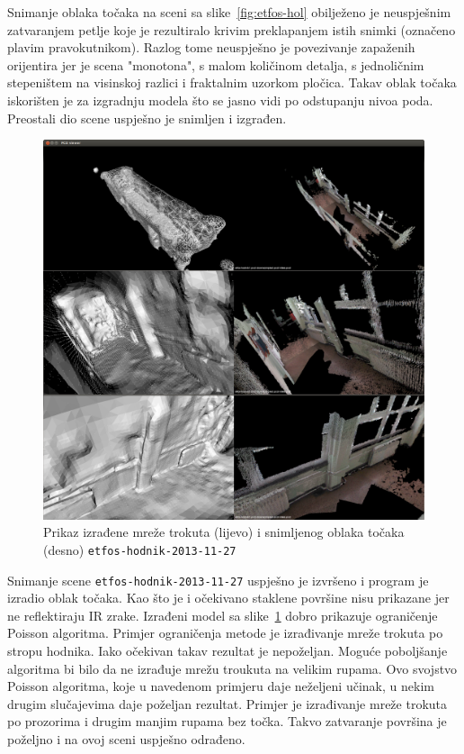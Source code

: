 Snimanje oblaka točaka na sceni sa slike~\ref{fig:etfos-hol} obilježeno
je neuspješnim zatvaranjem petlje koje je rezultiralo krivim
preklapanjem istih snimki (označeno plavim pravokutnikom). Razlog tome
neuspješno je povezivanje zapaženih orijentira jer je scena "monotona",
s malom količinom detalja, s jednoličnim stepeništem na visinskoj
razlici i fraktalnim uzorkom pločica. Takav oblak točaka iskorišten je
za izgradnju modela što se jasno vidi po odstupanju nivoa poda.
Preostali dio scene uspješno je snimljen i izgrađen.

\newpage
\begin{figure}[h]
\centering
\includegraphics[scale=0.25]{figures/04-etfos-hodnik1-vtk-pcd-all.png}
\caption{Prikaz izrađene mreže trokuta (lijevo) i snimljenog oblaka točaka
(desno) \texttt{etfos-hodnik-2013-11-27}} 
\label{fig:etfos-hodnik}
\end{figure}

Snimanje scene \texttt{etfos-hodnik-2013-11-27} uspješno je izvršeno i
program je izradio oblak točaka. Kao što je i očekivano staklene
površine nisu prikazane jer ne reflektiraju IR zrake. Izrađeni model sa
slike~\ref{fig:etfos-hodnik} dobro prikazuje ograničenje Poisson
algoritma. Primjer ograničenja metode je izrađivanje mreže trokuta po
stropu hodnika. Iako očekivan takav rezultat je nepoželjan. Moguće
poboljšanje algoritma bi bilo da ne izrađuje mrežu troukuta na velikim
rupama. Ovo svojstvo Poisson algoritma, koje u navedenom primjeru daje
neželjeni učinak, u nekim drugim slučajevima daje poželjan rezultat.
Primjer je izrađivanje mreže trokuta po prozorima i drugim manjim rupama
bez točka. Takvo zatvaranje površina je poželjno i na ovoj sceni
uspješno odrađeno.

